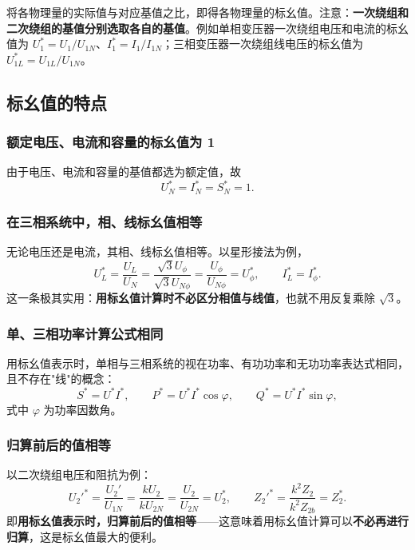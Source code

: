 将各物理量的实际值与对应基值之比，即得各物理量的标幺值。注意：\textbf{一次绕组和二次绕组的基值分别选取各自的基值}。例如单相变压器一次绕组电压和电流的标幺值为 $U_1^{*}=U_1/U_{1N}$、$I_1^{*}=I_1/I_{1N}$；三相变压器一次绕组线电压的标幺值为 $U_{1L}^{*}=U_{1L}/U_{1N}$。

\subsection{标幺值的特点}

\subsubsection{额定电压、电流和容量的标幺值为 1}
由于电压、电流和容量的基值都选为额定值，故
\begin{equation}
U_N^{*}=I_N^{*}=S_N^{*}=1 .
\end{equation}

\subsubsection{在三相系统中，相、线标幺值相等}
无论电压还是电流，其相、线标幺值相等。以星形接法为例，
\begin{equation}
U_L^{*}=\frac{U_L}{U_N}=\frac{\sqrt3U_\phi}{\sqrt3U_{N\phi}}=\frac{U_\phi}{U_{N\phi}}=U_\phi^{*},\qquad
I_L^{*}=I_\phi^{*}.
\end{equation}
这一条极其实用：\textbf{用标幺值计算时不必区分相值与线值}，也就不用反复乘除 $\sqrt3$。

\subsubsection{单、三相功率计算公式相同}
用标幺值表示时，单相与三相系统的视在功率、有功功率和无功功率表达式相同，且不存在"线"的概念：
\begin{equation}
S^{*}=U^{*}I^{*},\qquad P^{*}=U^{*}I^{*}\cos\varphi,\qquad Q^{*}=U^{*}I^{*}\sin\varphi,
\end{equation}
式中 $\varphi$ 为功率因数角。

\subsubsection{归算前后的值相等}
以二次绕组电压和阻抗为例：
\begin{equation}
U_2'^{*}=\frac{U_2'}{U_{1N}}=\frac{kU_2}{kU_{2N}}=\frac{U_2}{U_{2N}}=U_2^{*},\qquad
Z_2'^{*}=\frac{k^{2}Z_2}{k^{2}Z_{2b}}=Z_2^{*}.
\end{equation}
即\textbf{用标幺值表示时，归算前后的值相等}——这意味着用标幺值计算可以\textbf{不必再进行归算}，这是标幺值最大的便利。

